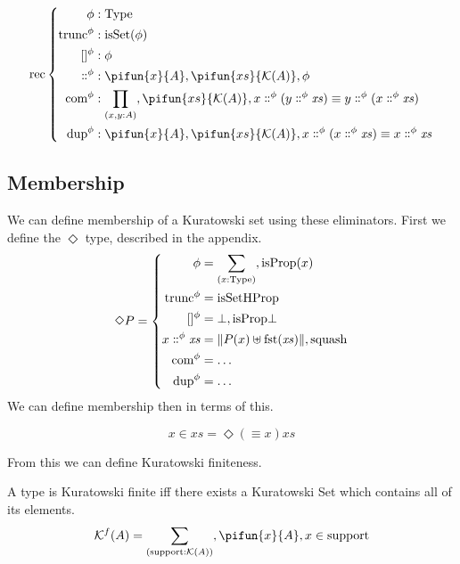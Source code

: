 \begin{equation} \label{kuratowski-rec}
  \text{rec} \left\{ \begin{aligned}
    \phi &: \text{Type} \\
    \text{trunc}^\phi &: \text{isSet}(\phi) \\
    []^\phi &: \phi \\
    \dblcolon^\phi &: \pifun{x}{A} , \pifun{xs}{\mathcal{K}(A)} , \phi \\
    \text{com}^\phi &: \prod_{(x , y : A)} , \pifun{xs}{\mathcal{K}(A)} , x \dblcolon^\phi (y \dblcolon^\phi \mathit{xs}) \equiv y \dblcolon^\phi (x \dblcolon^\phi \mathit{xs}) \\
    \text{dup}^\phi &: \pifun{x}{A} , \pifun{xs}{\mathcal{K}(A)} , x \dblcolon^\phi (x \dblcolon^\phi \mathit{xs}) \equiv x \dblcolon^\phi \mathit{xs}
  \end{aligned} \right.
\end{equation}


\subsection{Membership}
We can define membership of a Kuratowski set using these eliminators.
First we define the \(\Diamond\) type, described in the appendix.
\begin{equation}
  \Diamond P = \left\{ \begin{aligned}
    \phi &= \sum_{(x : \text{Type})} , \text{isProp}(x) \\
    \text{trunc}^\phi &= \text{isSetHProp} \\
    []^\phi &= \bot , \text{isProp}\bot \\
    x \dblcolon^\phi \mathit{xs} &= \lVert P(x) \uplus \text{fst}(\mathit{xs}) \rVert , \text{squash} \\
    \text{com}^\phi &= \dots \\
    \text{dup}^\phi &= \dots
  \end{aligned} \right.
\end{equation}
We can define membership then in terms of this.
\begin{rm-definition}
  \begin{equation}
    x \in \mathit{xs} = \Diamond (\equiv x) \mathit{xs}
  \end{equation}
\end{rm-definition}

From this we can define Kuratowski finiteness.
\begin{rm-definition}
  A type is Kuratowski finite iff there exists a Kuratowski Set which contains
  all of its elements.
  \begin{equation}
    \mathcal{K}^{f}(A) = \sum_{(\text{support} : \mathcal{K}(A))} , \pifun{x}{A} , x \in \text{support}
  \end{equation}
\end{rm-definition}

